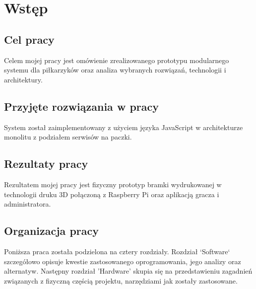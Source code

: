 \chapter{Wstęp}
\label{ch:funplenop}

\section{Cel pracy}
Celem mojej pracy jest omówienie zrealizowanego prototypu modularnego systemu dla piłkarzyków oraz analiza wybranych rozwiązań, technologii i architektury.

\section{Przyjęte rozwiązania w pracy}
System został zaimplementowany z użyciem języka JavaScript w architekturze monolitu z podziałem serwisów na paczki.

\section{Rezultaty pracy}
Rezultatem mojej pracy jest fizyczny prototyp bramki wydrukowanej w technologii druku 3D połączoną z Raspberry Pi oraz aplikacją gracza i administratora.

\section{Organizacja pracy}
Poniższa praca została podzielona na cztery rozdziały.
Rozdział `Software` szczegółowo opisuje kwestie zastosowanego oprogramowania, jego analizy oraz alternatyw. Następny rozdział 'Hardware' skupia się na przedstawieniu zagadnień związanych z fizyczną częścią projektu, narzędziami jak zostały zastosowane.

